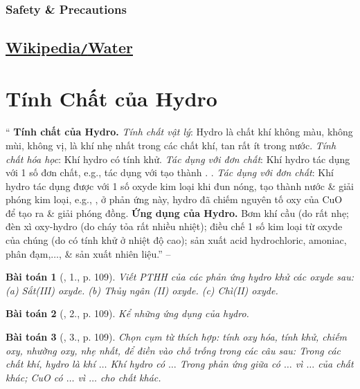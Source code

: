 \documentclass{article}
\newtheorem{baitoan}{Bài toán}
\begin{document}
\subsubsection{Safety \& Precautions}


\subsection{\href{https://en.wikipedia.org/wiki/Water}{Wikipedia\texttt{/}Water}}


\section{Tính Chất của Hydro}
`` \textsf{\textbf{Tính chất của Hydro.}} \textit{Tính chất vật lý}: Hydro là chất khí không màu, không mùi, không vị, là khí nhẹ nhất trong các chất khí, tan rất ít trong nước. \textit{Tính chất hóa học}: Khí hydro có tính khử. \textit{Tác dụng với đơn chất}: Khí hydro tác dụng với 1 số đơn chất, e.g.,  tác dụng với  tạo thành . . \textit{Tác dụng với đơn chất}: Khí hydro tác dụng được với 1 số oxyde kim loại khi đun nóng, tạo thành nước \& giải phóng kim loại, e.g., , ở phản ứng này, hydro đã chiếm nguyên tố oxy của CuO để tạo ra  \& giải phóng đồng.  \textsf{\textbf{Ứng dụng của Hydro.}} Bơm khí cầu (do rất nhẹ; đèn xì oxy-hydro (do cháy tỏa rất nhiều nhiệt); điều chế 1 số kim loại từ oxyde của chúng (do có tính khử ở nhiệt độ cao); sản xuất acid hydrochloric, amoniac, phân đạm,$\ldots$, \& sản xuất nhiên liệu.'' -- \cite[Chap. 5, \S1, pp. 78--79]{Truong_BTNC_Hoa_Hoc_8_2022}

\begin{baitoan}[\cite{SGK_Hoa_Hoc_8}, 1., p. 109]
	Viết PTHH của các phản ứng hydro khử các oxyde sau: (a) Sắt(III) oxyde. (b) Thủy ngân (II) oxyde. (c) Chì(II) oxyde.
\end{baitoan}

\begin{baitoan}[\cite{SGK_Hoa_Hoc_8}, 2., p. 109]
	Kể những ứng dụng của hydro.
\end{baitoan}

\begin{baitoan}[\cite{SGK_Hoa_Hoc_8}, 3., p. 109]
	Chọn cụm từ thích hợp: tính oxy hóa, tính khử, chiếm oxy, nhường oxy, nhẹ nhất, để điền vào chỗ trống trong các câu sau: Trong các chất khí, hydro là khí $\ldots$ Khí hydro có $\ldots$ Trong phản ứng giữa \emph{} có $\ldots$ vì $\ldots$ của chất khác; \emph{CuO} có $\ldots$ vì $\ldots$ cho chất khác.
\end{baitoan}
\end{document}
